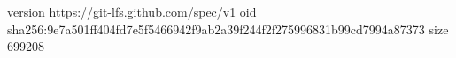 version https://git-lfs.github.com/spec/v1
oid sha256:9e7a501ff404fd7e5f5466942f9ab2a39f244f2f275996831b99cd7994a87373
size 699208
